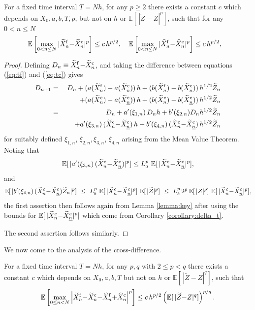 \documentclass[review]{siamart190516}
\def \EE {{\mathbb{E}}}
\def \tZ {{\widetilde{Z}}}
\def \tXfn {{\widetilde{X}^{\rm f}_n}}
\def \tXcn {{\widetilde{X}^{\rm c}_n}}
\def \tXcl {{\widetilde{X}^{\rm c}_{\underline{n}}}}
\def \hXfn {{\widehat{X}^{\rm f}_n}}
\def \hXcn {{\widehat{X}^{\rm c}_n}}
\begin{document}
\begin{lemma}
\label{lemma:delta_h}
For a fixed time interval $T\!=\!N h$, for any $p\!\geq\!2$ there exists a 
constant $c$ which depends on $X_0, a, b, T, p$, but not on $h$ or 
$\EE[\, |\tZ{-}Z|^p]$, such that for any $0\!<\!n\!\leq\!N$
\[
\EE\left[ \max_{0< n \leq N} |\tXfn{-}\tXcn|^p\right] \leq c\, h^{p/2}, ~~~ 
\EE\left[ \max_{0< n \leq N} |\hXfn{-}\hXcn|^p\right] \leq c\, h^{p/2}, ~~~ 
\]
\end{lemma}
\begin{proof}
Defining $D_n \equiv \tXfn {-} \tXcn$, and taking the difference between 
equations (\ref{eq:tf}) and (\ref{eq:tc}) gives
\begin{eqnarray*}
D_{n+1} &=& D_n + (a(\tXfn)-a(\tXcn))\, h + (b(\tXfn)-b(\tXcn)) \, h^{1/2} \tZ_n
\\     &&~~~~ + (a(\tXcn)-a(\tXcl)) \, h + (b(\tXcn)-b(\tXcl)) \, h^{1/2} \tZ_n
\\     &=& D_n + a'(\xi_{1,n})\, D_n h + b'(\xi_{2,n}) D_n h^{1/2} \tZ_n
\\     &&~~~~ + a'(\xi_{3,n})\, (\tXcn{-}\tXcl) \, h
          +  b'(\xi_{4,n})\, (\tXcn{-}\tXcl) \, h^{1/2} \tZ_n
\end{eqnarray*}
for suitably defined $\xi_{1,n}$, $\xi_{2,n}, \xi_{3,n}$, $\xi_{4,n}$ arising 
from the Mean Value Theorem.  
Noting that
\[
\EE[\,|a'(\xi_{3,n})\, (\tXcn{-}\tXcl) |^p] \leq
L_a^p \ \EE[\,|\tXcn{-}\tXcl|^p],
\]
and
\[
\EE[\,|b'(\xi_{4,n})\, (\tXcn{-}\tXcl)  \tZ_n|^p] 
\ \leq\ L_b^p \ \EE[\,|\tXcn{-}\tXcl|^p]\ \EE[\,|\tZ|^p]
\ \leq\ L_b^p\, 2^{p} \, \EE[\,|Z|^p]\ \EE[\,|\tXcn{-}\tXcl|^p],
\]
the first assertion then follows again from 
Lemma \ref{lemma:key} after using the bounds for $\EE[\,|\tXcn{-}\tXcl|^p]$ 
which come from Corollary \ref{corollary:delta_t}.

The second assertion follows similarly.
\end{proof}

We now come to the analysis of the cross-difference.

\begin{lemma}
\label{lemma:second_diff}
For a fixed time interval $T\!=\!N h$, for any $p, q$ with 
$2\!\leq\! p \!<\! q$ there exists a constant $c$ which depends on $
X_0, a, b, T$ but not on $h$ or $\EE[\, |\tZ{-}Z|^q]$, such that
\[
\EE\left[ \max_{0\leq n < N} \left|\tXfn{-}\tXcn {-} \hXfn{+}\hXcn\right|^p\right] 
\leq c\, h^{p/2} \left( \EE[\,|\tZ{-}Z|^q] \right)^{p/q}.
\]
\end{lemma}
\end{document}
